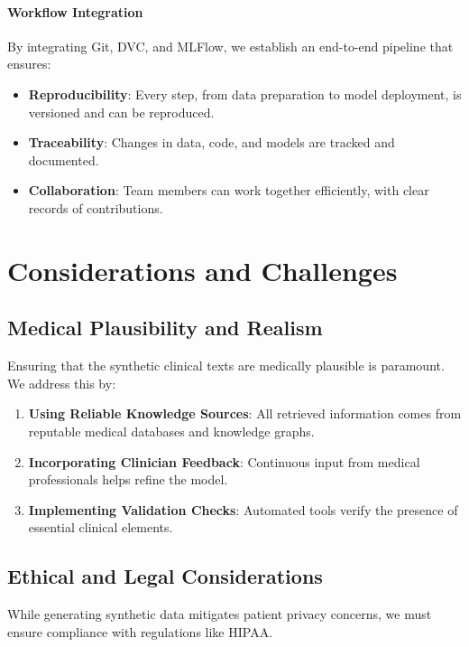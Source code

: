 \documentclass[12pt, a4paper]{article}
\begin{document}
\paragraph{Workflow Integration}

By integrating Git, DVC, and MLFlow, we establish an end-to-end pipeline that ensures:

\begin{itemize}
    \item \textbf{Reproducibility}: Every step, from data preparation to model deployment, is versioned and can be reproduced.
    \item \textbf{Traceability}: Changes in data, code, and models are tracked and documented.
    \item \textbf{Collaboration}: Team members can work together efficiently, with clear records of contributions.
\end{itemize}

\section{Considerations and Challenges}

\subsection{Medical Plausibility and Realism}

Ensuring that the synthetic clinical texts are medically plausible is paramount. We address this by:

\begin{enumerate}
    \item \textbf{Using Reliable Knowledge Sources}: All retrieved information comes from reputable medical databases and knowledge graphs.
    \item \textbf{Incorporating Clinician Feedback}: Continuous input from medical professionals helps refine the model.
    \item \textbf{Implementing Validation Checks}: Automated tools verify the presence of essential clinical elements.
\end{enumerate}

\subsection{Ethical and Legal Considerations}

While generating synthetic data mitigates patient privacy concerns, we must ensure compliance with regulations like HIPAA.
\end{document}
